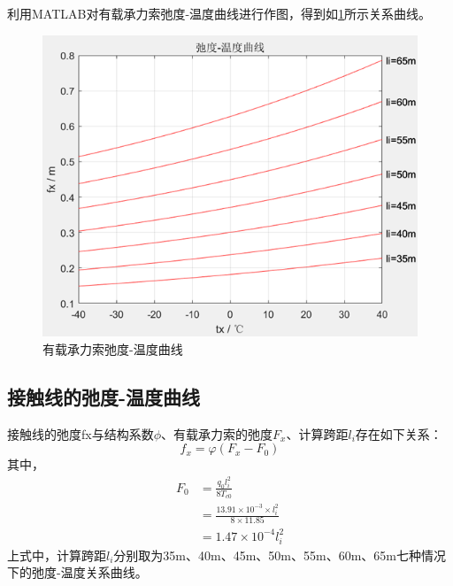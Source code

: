 \begin{table}[H]
	\centering
	\caption{有载承力索弛度-温度曲线表（跨距为li=65m）}
	\label{tab:有载承力索弛度-温度曲线表（跨距为li=65m）}
\end{table}
利用MATLAB对有载承力索弛度-温度曲线进行作图，得到如\ref{fig:-有载承力索弛度-温度曲线}所示关系曲线。
\begin{figure}[h]
	\centering
	\includegraphics[width=0.7\linewidth]{figures/有载承力索弛度-温度曲线}
	\caption{有载承力索弛度-温度曲线}
	\label{fig:-有载承力索弛度-温度曲线}
\end{figure}

\subsection{接触线的弛度-温度曲线}
接触线的弛度fx与结构系数$\phi$、有载承力索的弛度$F_x$、计算跨距$l_i$存在如下关系：
$$
f_x=\varphi (F_x-F_0)
$$
其中，
\begin{align*}
	F_0&=\frac{q_0l_{i}^{2}}{8T_{c0}}
	\\
	&=\frac{13.91\times 10^{-3}\times l_{i}^{2}}{8\times 11.85}
	\\
	&=1.47\times 10^{-4}l_{i}^{2}
\end{align*}
上式中，计算跨距$l_i$分别取为35m、40m、45m、50m、55m、60m、65m七种情况下的弛度-温度关系曲线。

